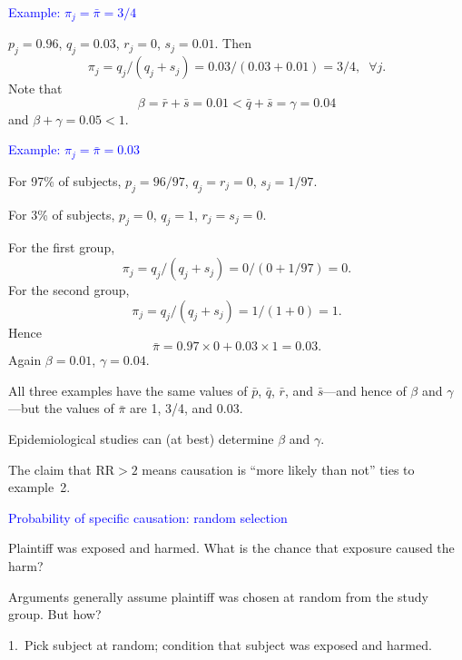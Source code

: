 \documentclass[landscape]{slides}
\newcommand{\RR}{{\mbox{RR}}}
\newcommand{\beq}{\begin{equation}}
\newcommand{\eeq}{\end{equation}}
\begin{document}
\begin{slide}
\begin{slide}{\textcolor{blue}{Example:  $\pi_j = \bar{\pi} = 3/4$}}

$p_j = 0.96$, $q_j = 0.03$, $r_j = 0$, $s_j = 0.01$.
Then 
\beq
    \pi_j = q_j/(q_j + s_j) =  0.03/(0.03 + 0.01) = 3/4, \;\; \forall j.
\eeq
Note that 
\beq
    \beta = \bar{r} + \bar{s} = 0.01 < \bar{q} + \bar{s}  = \gamma = 0.04
\eeq
and $\beta + \gamma = 0.05 < 1$.
\end{slide}

\begin{slide}{\textcolor{blue}{Example:  $\pi_j = \bar{\pi} = 0.03$}}

For 97\% of subjects, $p_j = 96/97$, $q_j = r_j = 0$, $s_j = 1/97$.

For 3\% of subjects, $p_j = 0$, $q_j = 1$, $r_j = s_j = 0$.

For the first group, 
\beq
    \pi_j = q_j/(q_j + s_j) =  0/(0 + 1/97) = 0.
\eeq
For the second group,
\beq
    \pi_j = q_j/(q_j + s_j) =  1/(1 + 0) = 1.
\eeq
Hence
\beq
    \bar{\pi} = 0.97 \times 0 + 0.03 \times 1 = 0.03.
\eeq
Again $\beta = 0.01$, $\gamma = 0.04$.

All three examples have the same values of $\bar{p}$, $\bar{q}$, $\bar{r}$, 
and $\bar{s}$---and hence of $\beta$ and $\gamma$---but the values of 
$\bar{\pi}$ are 1, 3/4, and 0.03.

\end{slide}

\begin{slide}

Epidemiological studies can (at best) determine $\beta$ and $\gamma$.

The claim that $\RR > 2$ means causation is ``more likely than not'' 
ties to example~2.
\end{slide}

\begin{slide}{\textcolor{blue}{Probability of specific causation: random selection}}

Plaintiff was exposed and harmed.
What is the chance that exposure caused the harm?

Arguments generally assume plaintiff was chosen at random from
the study group.   But how?

1.~Pick subject at random; condition that subject was exposed and harmed.


\end{slide}
\end{slide}
\end{document}
